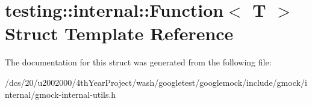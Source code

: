 \hypertarget{structtesting_1_1internal_1_1Function}{}\section{testing\+:\+:internal\+:\+:Function$<$ T $>$ Struct Template Reference}
\label{structtesting_1_1internal_1_1Function}


The documentation for this struct was generated from the following file\+:\begin{DoxyCompactItemize}
\item 
/dcs/20/u2002000/4th\+Year\+Project/wash/googletest/googlemock/include/gmock/internal/gmock-\/internal-\/utils.\+h\end{DoxyCompactItemize}
